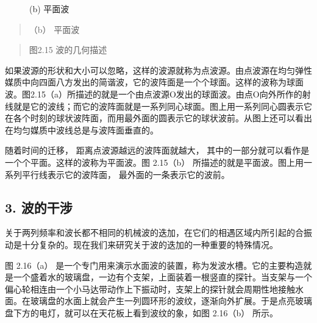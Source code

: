 \begin{figure}
\centering
{}
\caption{(b) 平面波}
\end{figure}

\begin{quote}
（b） 平面波
\end{quote}

\begin{quote}
图2.15 波的几何描述
\end{quote}

如果波源的形状和大小可以忽略，这样的波源就称为点波源。由点波源在均匀弹性媒质中向四面八方发出的简谐波，它的波阵面是一个个球面。这样的波称为球面波。图2.15（a）所描述的就是一个由点波源O发出的球面波。由点O向外所作的射线就是它的波线；而它的波阵面就是一系列同心球面。图上用一系列同心圆表示它在各个时刻的球状波阵面，而用最外面的圆表示它的球状波前。从图上还可以看出在均匀媒质中波线总是与波阵面垂直的。

随着时间的迁移， 距离点波源越远的波阵面就越大，
其中的一部分就可以看作是一个个平面。这样的波称为平面波。图 2.15（b）
所描述的就是平面波。图上用一系列平行线表示它的波阵面，
最外面的一条表示它的波前。

\subsection{3. 波的干涉}\label{ux6ce2ux7684ux5e72ux6d89-1}

关于两列频率和波长都不相同的机械波的迭加，在它们的相遇区域内所引起的合振动是十分复杂的。现在我们来研究关于波的迭加的一种重要的特殊情况。

图 2.16（a）
是一个专门用来演示水面波的装置，称为发波水槽。它的主要构造就是一个盛着水的玻璃盘，一边有个支架，上面装着一根竖直的探针。当支架与一个偏心轮相连由一个小马达带动作上下振动时，支架上的探针就会周期性地接触水面。在玻璃盘的水面上就会产生一列圆环形的波纹，逐渐向外扩展。于是点亮玻璃盘下方的电灯，就可以在天花板上看到波纹的象，如图
2.16（b） 所示。

